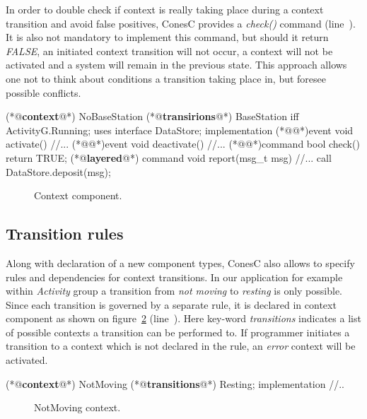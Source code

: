 In order to double check if context is really taking place during a context transition and avoid false positives, ConesC provides a \emph{check()} command (line~). It is also not mandatory to implement this command, but should it return \emph{FALSE}, an initiated context transition will not occur, a context will not be activated and a system will remain in the previous state. This approach allows one not to think about conditions a transition taking place in, but foresee possible conflicts.

\begin{Sbox}
\begin{minipage}{\columnwidth}
\begin{csource}
(*@\textbf{context}@*) NoBaseStation {
 (*@\textbf{transirions}@*) BaseStation iff ActivityG.Running;
  uses interface DataStore;
}implementation {
 (*@@*)event void activate(){
  //...}
 (*@@*)event void deactivate(){
  //...}
 (*@@*)command bool check(){
  return TRUE;}
 (*@\textbf{layered}@*) command void report(msg_t msg){
  //...
  call DataStore.deposit(msg);}}
\end{csource}
\end{minipage}
\end{Sbox}
\begin{figure}[!h]
 \TheSbox
 \caption{Context component.}
 \label{fig:cc}
\end{figure}

\subsection{Transition rules}

Along with declaration of a new component types, ConesC also allows to specify rules and dependencies for context transitions. In our application for example within \emph{Activity} group a transition from \emph{not moving} to \emph{resting} is only possible. Since each transition is governed by a separate rule, it is declared in context component as shown on figure~\ref{fig:nmc} (line~). Here key-word \emph{transitions} indicates a list of possible contexts a transition can be performed to. If programmer initiates a transition to a context which is not declared in the rule, an \emph{error} context will be activated.

\begin{Sbox}
\begin{minipage}{\columnwidth}
\begin{csource}
(*@\textbf{context}@*) NotMoving {
 (*@\textbf{transitions}@*) Resting;
}implementation {
 //..}
\end{csource}
\end{minipage}
\end{Sbox}
\begin{figure}[!h]
 \TheSbox
 \caption{NotMoving context.}
 \label{fig:nmc}
\end{figure}

